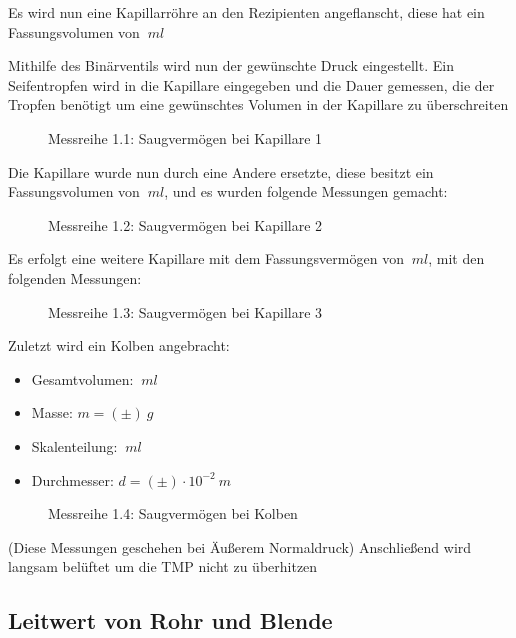 \documentclass[12pt, a4paper]{scrartcl}
\begin{document}
    	Es wird nun eine Kapillarröhre an den Rezipienten angeflanscht, diese hat ein Fassungsvolumen von $\ ml$
    
    	Mithilfe des Binärventils wird nun der gewünschte Druck eingestellt. Ein Seifentropfen wird in die Kapillare eingegeben und die Dauer gemessen, die der Tropfen benötigt um eine gewünschtes Volumen in der Kapillare zu überschreiten
    	
    	\begin{figure}[H]
    		\centering
    		\caption{Messreihe 1.1: Saugvermögen bei Kapillare 1}
    	\end{figure}
    	
    	Die Kapillare wurde nun durch eine Andere ersetzte, diese besitzt ein Fassungsvolumen von $\ ml$, und es wurden folgende Messungen gemacht:
    	
 	    \begin{figure}[H]
    		\centering
    		\caption{Messreihe 1.2: Saugvermögen bei Kapillare 2}
    	\end{figure}
    	
    	Es erfolgt eine weitere Kapillare mit dem Fassungsvermögen von $\ ml$, mit den folgenden Messungen:
    	
    	\begin{figure}[H]
			\centering
			\caption{Messreihe 1.3: Saugvermögen bei Kapillare 3}
		\end{figure}
    	
    	Zuletzt wird ein Kolben angebracht:
    	
    	\begin{itemize}
    		\item Gesamtvolumen: $\ ml$
    		\item Masse: $m=(\pm)\ g$
    		\item Skalenteilung: $\ ml$
    		\item Durchmesser: $d=(\pm)\cdot10^{-2}\ m$
    	\end{itemize}
    
    	\begin{figure}[H]
			\centering
			\caption{Messreihe 1.4: Saugvermögen bei Kolben}
		\end{figure}
    	
    	(Diese Messungen geschehen bei Äußerem Normaldruck)
    	Anschließend wird langsam belüftet um die TMP nicht zu überhitzen
    	
    
    \subsection{Leitwert von Rohr und Blende}
    
\end{document}

